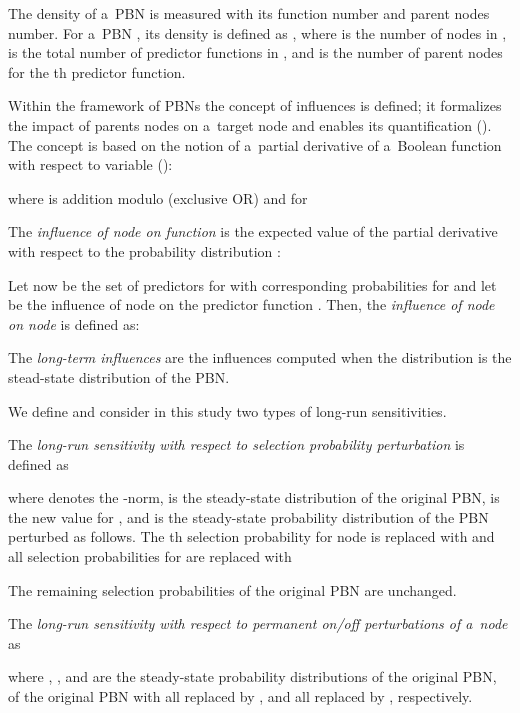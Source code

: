 \documentclass[runningheads,a4paper]{llncs}
\begin{document}
The density of a~PBN is measured with its function number and parent nodes number. For a~PBN ,
its density is defined as , where  is
the number of nodes in ,  is the total number of predictor functions in , and
 is the number of parent nodes for the th predictor function.


Within the framework of PBNs the concept of influences is defined; it formalizes the impact
of parents nodes on a~target node and enables its quantification (\cite{SDKZ02}). The concept is
based on the notion of a~partial derivative of a~Boolean function  with respect to variable
 ():

where  is addition modulo  (exclusive OR) and for 

The \emph{influence of node  on function } is the expected value of the partial derivative
with respect to the probability distribution :

Let now  be the set of predictors for  with corresponding probabilities  for
 and let  be the influence of node  on the predictor
function . Then, the \emph{influence of node  on node } is
defined as:

The \emph{long-term influences} are the influences computed when the distribution  is the
stead-state distribution of the PBN.

We define and consider in this study two types of long-run sensitivities.

\begin{definition}
\label{def:LRS_prob}
The \emph{long-run sensitivity with respect to selection probability perturbation} is defined as

where  denotes the -norm,  is the steady-state distribution of the
original PBN,  is the new value for , and
 is the steady-state probability distribution of the PBN
perturbed as follows. The th selection probability for node  is replaced with
 and all  selection probabilities for  are replaced with

The remaining selection probabilities of the original PBN are unchanged.
\end{definition}

\begin{definition}
\label{def:LRS_node}
The \emph{long-run sensitivity with respect to permanent on/off perturbations of a~node } as

where , , and  are the steady-state probability distributions of the original PBN, of the original PBN with
all  replaced by , and all 
replaced by , respectively.
\end{definition}
\end{document}
